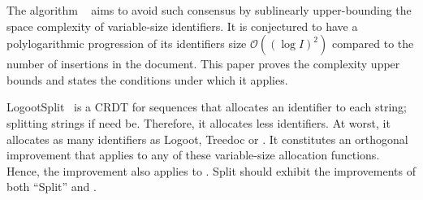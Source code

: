 \noindent The algorithm \LSEQ~\cite{nedelec2013lseq} aims to avoid such
consensus by sublinearly upper-bounding the space complexity of variable-size
identifiers. It is conjectured to have a polylogarithmic progression of its
identifiers size $\mathcal{O}((\log I)^2)$ compared to the number of insertions
in the document. This paper proves the complexity upper bounds and states the
conditions under which it applies.

LogootSplit~\cite{andre2013supporting} is a CRDT for sequences that allocates an
identifier to each string; splitting strings if need be. Therefore, it allocates
less identifiers. At worst, it allocates as many identifiers as Logoot, Treedoc
or \LSEQ. It constitutes an orthogonal improvement that applies to any of these
variable-size allocation functions. Hence, the improvement also applies to
\LSEQ. \LSEQ{}Split should exhibit the improvements of both ``Split'' and \LSEQ.


